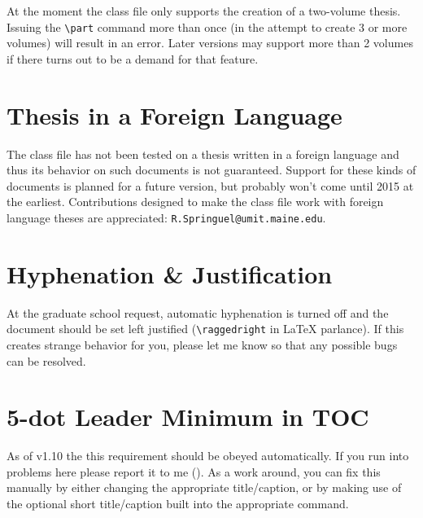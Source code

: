 At the moment the class file only supports the creation of a two-volume thesis.  Issuing the \verb=\part= command more than once (in the attempt to create 3 or more volumes) will result in an error.  Later versions may support more than 2 volumes if there turns out to be a demand for that feature.

\section{Thesis in a Foreign Language}
The class file has not been tested on a thesis written in a foreign language and thus its behavior on such documents is not guaranteed.  Support for these kinds of documents is planned for a future version, but probably won't come until 2015 at the earliest.  Contributions designed to make the class file work with foreign language theses are appreciated: \verb=R.Springuel@umit.maine.edu=.

\section{Hyphenation \& Justification}
At the graduate school request, automatic hyphenation is turned off and the document should be set left justified (\verb=\raggedright= in LaTeX parlance).  If this creates strange behavior for you, please let me know so that any possible bugs can be resolved.

\section{5-dot Leader Minimum in TOC}
As of v1.10 the this requirement should be obeyed automatically.  If you run into problems here please report it to me (\email).  As a work around, you can fix this manually by either changing the appropriate title/caption, or by making use of the optional short title/caption built into the appropriate command.

\endinput

